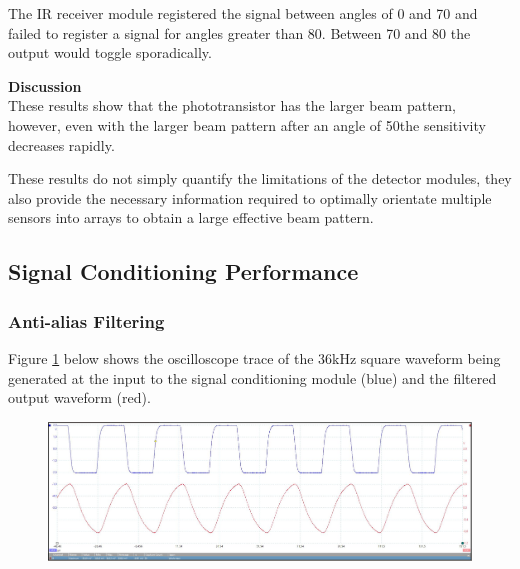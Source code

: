 The IR receiver module registered the signal between angles of 0\textdegree{} and 70\textdegree{} and failed to register a signal for angles greater than 80\textdegree. Between 70\textdegree{} and 80\textdegree{} the output would toggle sporadically.


\textbf{Discussion}\\
These results show that the phototransistor has the larger beam pattern, however, even with the larger beam pattern after an angle of 50\textdegree the sensitivity decreases rapidly.

These results do not simply quantify the limitations of the detector modules, they also provide the necessary information required to optimally orientate multiple sensors into arrays to obtain a large effective beam pattern.








\subsection{Signal Conditioning Performance}

\subsubsection{Anti-alias Filtering}
Figure \ref{fig:anti_alias_filtering} below shows the oscilloscope trace of the 36kHz square waveform being generated at the input to the signal conditioning module (blue) and the filtered output waveform (red).

\begin{figure}[H]
	\centering
	\includegraphics[width=\textwidth]{figures/results/low_pass_filter/36kHzsquarewavein.JPG}
	\label{fig:anti_alias_filtering}
\end{figure}

